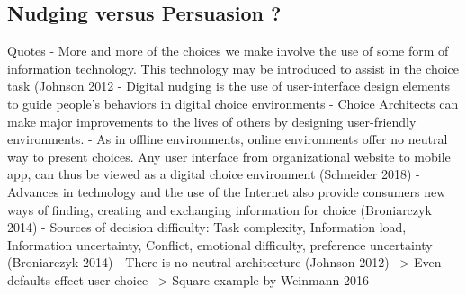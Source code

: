 \subsection{Nudging versus Persuasion ?}



Quotes
- More and more of the choices we make involve the use of some form of information technology. This technology may be introduced to assist in the choice task (Johnson 2012
- Digital nudging is the use of user-interface design elements to guide people's behaviors in digital choice environments
- Choice Architects can make major improvements to the lives of others by designing user-friendly environments.
- As in offline environments, online environments offer no neutral way to present choices. Any user interface from organizational website to mobile app, can thus be viewed as a digital choice environment (Schneider 2018)
- Advances in technology and the use of the Internet also provide consumers new ways of finding, creating and exchanging information for choice (Broniarczyk 2014)
- Sources of decision difficulty: Task complexity, Information load, Information uncertainty, Conflict, emotional difficulty, preference uncertainty (Broniarczyk 2014)
- There is no neutral architecture (Johnson 2012) --> Even defaults effect user choice --> Square example by Weinmann 2016
